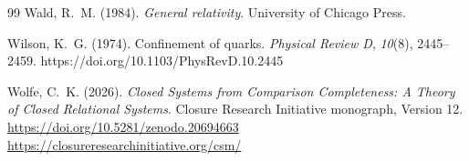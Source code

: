 \documentclass[12pt]{article}
\begin{document}
\begin{sloppypar}
\begin{thebibliography}{99}
Wald, R.~M. (1984).
\textit{General relativity}. University of Chicago Press.

Wilson, K.~G. (1974).
Confinement of quarks.
\textit{Physical Review D}, \textit{10}(8), 2445--2459.
https://doi.org/10.1103/PhysRevD.10.2445

Wolfe, C.~K. (2026).
\textit{Closed Systems from Comparison Completeness: A Theory of Closed
Relational Systems}.
Closure Research Initiative monograph, Version 12.
\url{https://doi.org/10.5281/zenodo.20694663}
\url{https://closureresearchinitiative.org/csm/}

\end{thebibliography}
\end{sloppypar}
\end{document}

